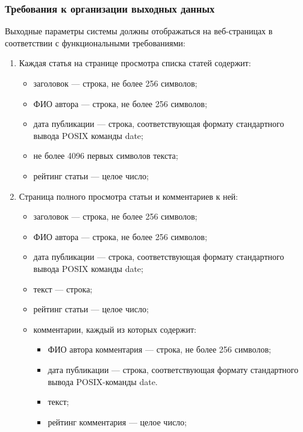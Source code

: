 \documentclass{bmstu-gost-7-32}
\begin{document}
\subsubsection{Требования к организации выходных данных}

Выходные параметры системы должны отображаться на веб-страницах в соответствии с функциональными требованиями:
\begin{enumerate}
	\item Каждая статья на странице просмотра списка статей содержит:
	\begin{itemize}
		\item заголовок — строка, не более 256 символов;
		\item ФИО автора — строка, не более 256 символов;
		\item дата публикации — строка, соответствующая формату стандартного вывода POSIX команды date;
		\item не более 4096 первых символов текста;
		\item рейтинг статьи — целое число;
	\end{itemize}
	\item Страница полного просмотра статьи и комментариев к ней:
	\begin{itemize}
		\item заголовок — строка, не более 256 символов;
		\item ФИО автора — строка, не более 256 символов;
		\item дата публикации — строка, соответствующая формату стандартного вывода POSIX команды date;
		\item текст — строка;
		\item рейтинг статьи — целое число;
		\item комментарии, каждый из которых содержит:
		\begin{itemize}
			\item ФИО автора комментария — строка, не более 256 символов;
			\item дата публикации — строка, соответствующая формату стандартного вывода POSIX-команды date.
			\item текст;
			\item рейтинг комментария — целое число;
		\end{itemize}
	\end{itemize}


\end{enumerate}
\end{document}
